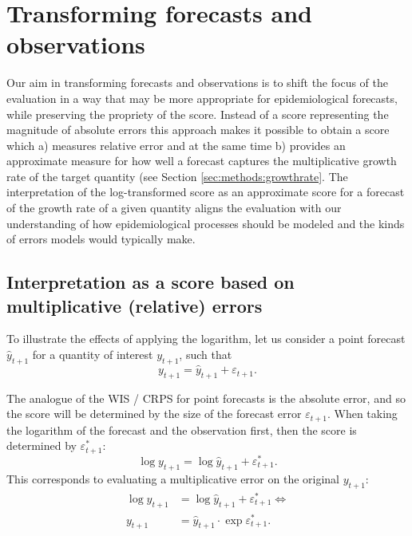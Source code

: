 \documentclass{article}
\begin{document}
\section{Transforming forecasts and observations}
\label{sec:methods}

Our aim in transforming forecasts and observations is to shift the focus of the evaluation in a way that may be more appropriate for epidemiological forecasts, while preserving the propriety of the score.  Instead of a score representing the magnitude of absolute errors this approach makes it possible to obtain a score which a) measures relative error and at the same time b) provides an approximate measure for how well a forecast captures the multiplicative growth rate of the target quantity (see Section \ref{sec:methods:growthrate}. The interpretation of the log-transformed score as an approximate score for a forecast of the growth rate of a given quantity aligns the evaluation with our understanding of how epidemiological processes should be modeled and the kinds of errors models would typically make. 


\subsection{Interpretation as a score based on multiplicative (relative) errors}
\label{sec:methods:relative}

To illustrate the effects of applying the logarithm, let us consider a point forecast $\hat{y}_{t+1}$ for a quantity of interest $y_{t+1}$, such that 
\begin{equation}
y_{t+1} = \hat{y}_{t+1} + \varepsilon_{t+1}.
\end{equation}

The analogue of the WIS / CRPS for point forecasts is the absolute error, and so the score will be determined by the size of the forecast error $\varepsilon_{t+1}$. When taking the logarithm of the forecast and the observation first, then the score is determined by $\varepsilon^*_{t+1}$: 
\begin{equation}
\log y_{t+1} = \log \hat{y}_{t+1} + \varepsilon^*_{t+1}.
\end{equation}
%
This corresponds to evaluating a multiplicative error on the original $y_{t+1}$:
%
\begin{align}
\log y_{t+1} &= \log \hat{y}_{t+1} + \varepsilon^*_{t+1} \Leftrightarrow \\    
y_{t+1} &= \hat{y}_{t+1} \cdot \exp{\varepsilon^*_{t+1}}.    
\end{align}
\end{document}
